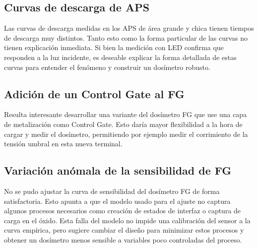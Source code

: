 \subsection{Curvas de descarga de APS}
Las curvas de descarga medidas en los APS de área grande y chica tienen tiempos
de descarga muy distintos.
Tanto esto como la forma particular de las curvas no tienen explicación
inmediata.
Si bien la medición con LED confirma que responden a la luz incidente,
es deseable explicar la forma detallada de estas curvas para entender el
fenómeno y construir un dosímetro robusto.
\subsection{Adición de un Control Gate al FG}
Resulta interesante desarrollar una variante del dosímetro FG que use una capa
de metalización como Control Gate.
Esto daría mayor flexibilidad a la hora de cargar y medir el dosímetro,
permitiendo por ejemplo medir el corrimiento de la tensión umbral en esta
nueva terminal.
\subsection{Variación anómala de la sensibilidad de FG}
No se pudo ajustar la curva de sensibilidad del dosímetro FG de forma
satisfactoria.
Esto apunta a que el modelo usado para el ajuste no captura algunos procesos
necesarios como creación de estados de interfaz o captura de carga en el óxido.
Esta falla del modelo no impide una calibración del sensor a la curva empírica,
pero sugiere cambiar el diseño para minimizar estos procesos y obtener un
dosímetro menos sensible a variables poco controladas del proceso.
